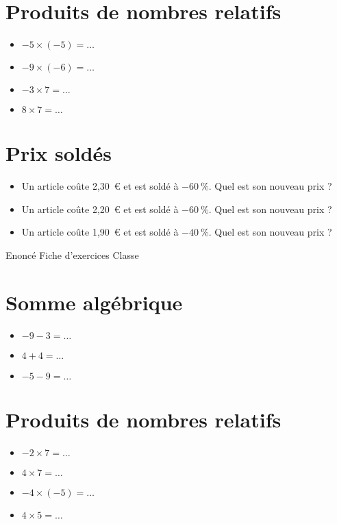 \documentclass[a4paper,11pt,fleqn]{article}
\begin{document}
\section{Produits de nombres relatifs}
\begin{itemize}

  \item $-5\times(-5)=\ldots$
  \item $-9\times(-6)=\ldots$
  \item $-3\times7=\ldots$
  \item $8\times7=\ldots$
\end{itemize}


\section{Prix soldés}
\begin{itemize}

  \item Un article coûte 2,30~€ et est soldé à $-60~\%$. Quel est son nouveau prix ?
  \item Un article coûte 2,20~€ et est soldé à $-60~\%$. Quel est son nouveau prix ?
  \item Un article coûte 1,90~€ et est soldé à $-40~\%$. Quel est son nouveau prix ?
\end{itemize}
\newpage
\setcounter{exo}{0}
\setcounter{section}{0}
{Enoncé} \hfill {\huge Fiche d'exercices } \hfill {Classe}

\section{Somme algébrique}
\begin{itemize}

  \item $-9 -3=\ldots$
  \item $4 +4=\ldots$
  \item $-5 -9=\ldots$
\end{itemize}


\section{Produits de nombres relatifs}
\begin{itemize}

  \item $-2\times7=\ldots$
  \item $4\times7=\ldots$
  \item $-4\times(-5)=\ldots$
  \item $4\times5=\ldots$
\end{itemize}
\end{document}
